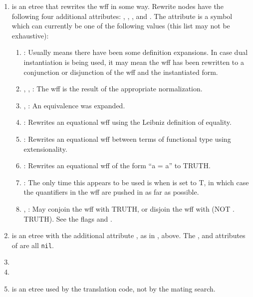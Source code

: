 \begin{enumerate}
\item {} is an etree that rewrites the wff in some way.
Rewrite nodes have the following four additional attributes:
, , ,
and .  The  attribute is
a symbol which can currently be one of the following values (this list may not be exhaustive):
\begin{enumerate}
\item {}:  Usually means there have been some definition expansions.
In case dual instantiation is being used, it may mean the wff has been rewritten to
a conjunction or disjunction of the wff and the instantiated form.
\item {}, , :  The wff is the result of the appropriate normalization.
\item {}, :  An equivalence was expanded.
\item {}:  Rewrites an equational wff using the Leibniz definition of equality.
\item {}:  Rewrites an equational wff between terms of functional type using extensionality.
\item {}: Rewrites an equational wff of the form ``a = a'' to TRUTH.
\item {}:  The only time this appears to be used is when 
is set to T, in which case the quantifiers in the wff are pushed in as far as possible.
\item {}, :  May conjoin the wff with TRUTH, or disjoin the wff with (NOT . TRUTH).
See the flags  and .
\end{enumerate}

\item {} is an etree with the additional attribute ,
as in , above. The , 
and  attributes of  are all {\tt nil}.

\item {}

\item {}

\item {}  is an etree used by the 
translation code, not by the mating search.

\end{enumerate}

